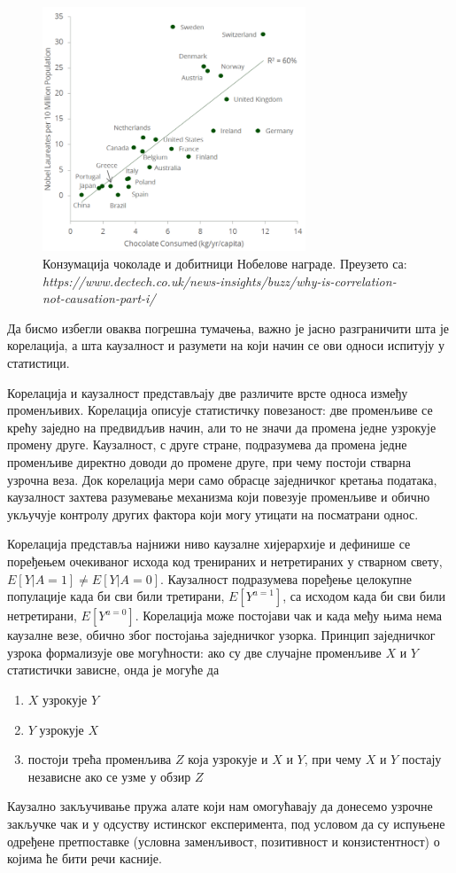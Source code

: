 \documentclass[12pt, a4paper]{article}
\begin{document}
\begin{figure}[h!]
    \centering
    \includegraphics[width=0.7\textwidth]{Chocolate_consumption.png}
    \caption{Конзумација чоколаде и добитници Нобелове награде. Преузето са: \textit{https://www.dectech.co.uk/news-insights/buzz/why-is-correlation-not-causation-part-i/}}
    \label{fig:uzrocnost}
\end{figure}

Да бисмо избегли оваква погрешна тумачења, важно је јасно разграничити шта је корелација, а шта каузалност и разумети на који начин се ови односи испитују у статистици.

Корелација и каузалност представљају две различите врсте односа између променљивих. Корелација описује статистичку повезаност: две променљиве се крећу заједно на 
предвидљив начин, али то не значи да промена једне узрокује промену друге. Каузалност, с друге стране, подразумева да промена једне променљиве директно доводи до 
промене друге, при чему постоји стварна узрочна веза. Док корелација мери само обрасце заједничког кретања података, каузалност захтева разумевање механизма који 
повезује променљиве и обично укључује контролу других фактора који могу утицати на посматрани однос.

Корелација представља најнижи ниво каузалне хијерархије и дефинише се поређењем очекиваног исхода код тренираних и нетретираних у стварном свету, $E[Y|A=1] \neq E[Y|A=0]$.
Каузалност подразумева поређење целокупне популације када би сви били третирани, $E[Y^{a=1}]$, са исходом када би сви били нетретирани, $E[Y^{a=0}]$.
Корелација може постојави чак и када међу њима нема каузалне везе, обично због постојања заједничког узорка.
Принцип заједничког узрока формализује ове могућности: ако су две случајне променљиве $X$ и $Y$ статистички 
зависне, онда је могуће да 
\begin{enumerate}
    \item $X$ узрокује $Y$
    \item $Y$ узрокује $X$
    \item постоји трећа променљива $Z$ која узрокује и $X$ и $Y$, при чему $X$ и $Y$ постају независне ако се узме у обзир $Z$
\end{enumerate}
Каузално закључивање пружа алате који нам омогућавају да донесемо узрочне закључке чак и у одсуству истинског експеримента, под условом да су испуњене
одређене претпоставке (условна заменљивост, позитивност и конзистентност) о којима ће бити речи касније. 
\end{document}
